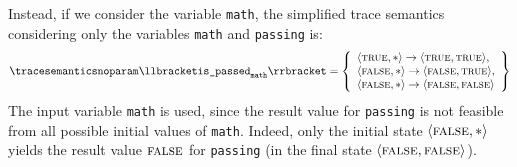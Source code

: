 \begin{example}
Instead, if we consider the variable \texttt{math}, the simplified trace semantics considering only the variables \texttt{math} and \texttt{passing} is:
\begin{align*}
  \tracesemanticsnoparam\semanticsof{\texttt{is\_passed}_\texttt{math}}
  =
  \left\{
    \begin{array}{l}
    \tuple\true\anyvalue\rightarrow\tuple\true\true, \\
    \tuple\false\anyvalue\rightarrow\tuple\false\true, \\
    \tuple\false\anyvalue\rightarrow\tuple\false\false
  \end{array}
  \right\}
\end{align*}
The input variable \texttt{math} is used, since the result value for \texttt{passing} is not feasible from all possible initial values of \texttt{math}.
Indeed, only the initial state $\langle \textsc{false}, {*} \rangle$ yields the result value $\textsc{false}$ for \texttt{passing} (in the final state $\langle \textsc{false}, \textsc{false} \rangle$).
\end{example}

